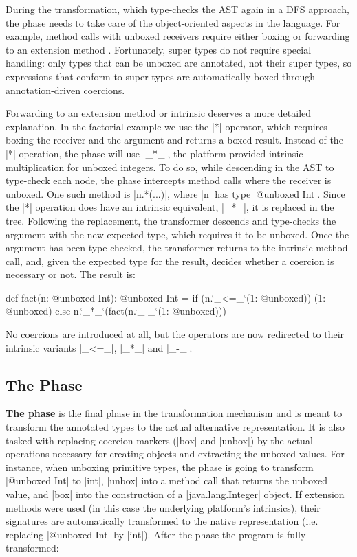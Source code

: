During the transformation, which type-checks the AST again in a DFS approach, the \coerce{} phase needs to take care of the object-oriented aspects in the language. For example, method calls with unboxed receivers require either boxing or forwarding to an extension method \cite{sip-value-classes}. Fortunately, super types do not require special handling: only types that can be unboxed are annotated, not their super types, so expressions that conform to super types are automatically boxed through annotation-driven coercions.

Forwarding to an extension method or intrinsic deserves a more detailed explanation. In the factorial example we use the |*| operator, which requires boxing the receiver and the argument and returns a boxed result. Instead of the |*| operation, the \coerce{} phase will use |_*_|, the platform-provided intrinsic multiplication for unboxed integers. To do so, while descending in the AST to type-check each node, the \coerce{} phase intercepts method calls where the receiver is unboxed. One such method is |n.*(...)|, where |n| has type |@unboxed Int|. Since the |*| operation does have an intrinsic equivalent, |_*_|, it is replaced in the tree. Following the replacement, the \coerce{} transformer descends and type-checks the argument with the new expected type, which requires it to be unboxed. Once the argument has been type-checked, the \coerce{} transformer returns to the intrinsic method call, and, given the expected type for the result, decides whether a coercion is necessary or not. The result is:

\begin{lstlisting-nobreak}
 def fact(n: @unboxed Int): @unboxed Int =
   if (n.`_<=_`(1: @unboxed))
     (1: @unboxed)
   else
     n.`_*_`(fact(n.`_-_`(1: @unboxed)))
\end{lstlisting-nobreak}

No coercions are introduced at all, but the operators are now redirected to their intrinsic variants |_<=_|, |_*_| and |_-_|.

\subsection{The \Commit{} Phase}
\label{ldl:sec:transform:commit}

\textbf{The \commit{} phase} is the final phase in the transformation mechanism and is meant to transform the annotated types to the actual alternative representation. It is also tasked with replacing coercion markers (|box| and |unbox|) by the actual operations necessary for creating objects and extracting the unboxed values. For instance, when unboxing primitive types, the \commit{} phase is going to transform |@unboxed Int| to |int|, |unbox| into a method call that returns the unboxed value, and |box| into the construction of a |java.lang.Integer| object. If extension methods were used (in this case the underlying platform's intrinsics), their signatures are automatically transformed to the native representation (i.e. replacing |@unboxed Int| by |int|). After the \commit{} phase the program is fully transformed:

